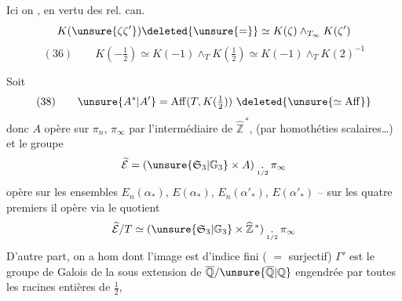 Ici on , en vertu des rel. can.
\[
K(\unsure{\zeta\zeta'})\deleted{\unsure{=}}\simeq
K(\zeta)\mathbin{\wedge}_{T_\infty}K(\zeta')
\]
\[
(36)\qquad K(-\tfrac12)\simeq K(-1)\mathbin{\wedge}_T K(\tfrac12)
\simeq K(-1)\mathbin{\wedge}_T K(2)^{-1}
\]

Soit
\[
(38)\qquad\unsure{A^*|A'}=\operatorname{Aff}(T,K(\tfrac12))\
\deleted{\unsure{\simeq\operatorname{Aff}}}
\]
donc
$A$ opère sur $\pi_n$, $\pi_\infty$ 
par l'intermédiaire de $\widehat{\mathbb Z}^{\,*}$,
(par homothéties scalaires\ldots) et le groupe
\[
\widetilde{\mathcal E}=(\unsure{\mathfrak S_3|\mathbb G_3}\times A)
\mathbin{\underset{\scriptscriptstyle1/2}{.}}\pi_\infty
\]
opère  sur les ensembles
$E_n(\alpha_*)$, $E(\alpha_*)$, $E_n(\alpha'_*)$, $E(\alpha'_*)$
-- sur les quatre premiers il opère via le quotient
\[
\widetilde{\mathcal E}/T\simeq
(\unsure{\mathfrak S_3|\mathbb G_3}\times\widehat{\mathbb Z}^{\,*})
\mathbin{\underset{\scriptscriptstyle1/2}{.}}\pi_\infty
\]
D'autre part, on a
\diagram{\[
(40)\qquad\begin{tikzcd}[ampersand replacement=\&]\Gamma\arrow[r]\&A\end{tikzcd}
\]}
hom dont l'image  est d'indice fini
( $=$ surjectif) $\Gamma'$ est le groupe de Galois de la
sous extension de $\overline{\mathbb Q}/\unsure{\overline{\mathbb Q}|\mathbb Q}$
engendrée par toutes les racines entières de $\frac12$,

